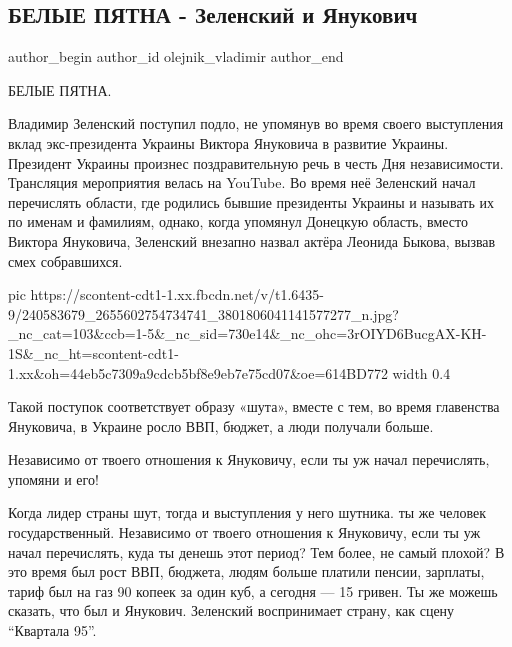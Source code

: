  
 
 
 
 
 
\subsection{БЕЛЫЕ ПЯТНА - Зеленский и Янукович}
\label{sec:25_08_2021.fb.olejnik_vladimir.5.belyje_pjatna}
 
\ifcmt
 author_begin
   author_id olejnik_vladimir
 author_end
\fi

БЕЛЫЕ ПЯТНА.

Владимир Зеленский поступил подло, не упомянув во время своего выступления
вклад экс-президента Украины Виктора Януковича в развитие Украины. Президент
Украины произнес поздравительную речь в честь Дня независимости. Трансляция
мероприятия велась на YouTube. Во время неё Зеленский начал перечислять
области, где родились бывшие президенты Украины и называть их по именам и
фамилиям, однако, когда упомянул Донецкую область, вместо Виктора Януковича,
Зеленский внезапно назвал актёра Леонида Быкова, вызвав смех собравшихся.

\ifcmt
  pic https://scontent-cdt1-1.xx.fbcdn.net/v/t1.6435-9/240583679_2655602754734741_3801806041141577277_n.jpg?_nc_cat=103&ccb=1-5&_nc_sid=730e14&_nc_ohc=3rOIYD6BucgAX-KH-1S&_nc_ht=scontent-cdt1-1.xx&oh=44eb5c7309a9cdcb5bf8e9eb7e75cd07&oe=614BD772
  width 0.4
\fi

Такой поступок соответствует образу «шута», вместе с тем, во время главенства
Януковича, в Украине росло ВВП, бюджет, а люди получали больше.

Независимо от твоего отношения к Януковичу, если ты уж начал перечислять,
упомяни и его!

Когда лидер страны шут, тогда и выступления у него шутника. ты же человек
государственный. Независимо от твоего отношения к Януковичу, если ты уж начал
перечислять, куда ты денешь этот период? Тем более, не самый плохой? В это
время был рост ВВП, бюджета, людям больше платили пенсии, зарплаты, тариф был
на газ 90 копеек за один куб, а сегодня — 15 гривен. Ты же можешь сказать, что
был и Янукович. Зеленский воспринимает страну, как сцену \enquote{Квартала 95}.

